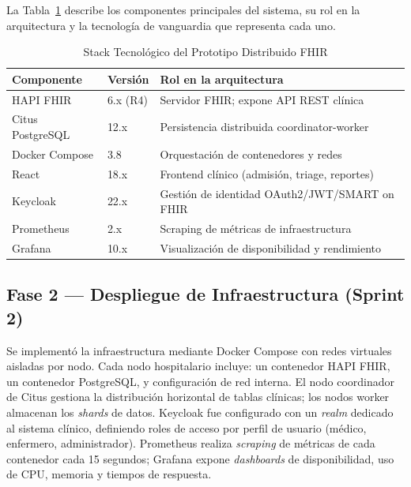 \documentclass[conference]{IEEEtran}
\begin{document}
La Tabla~\ref{tab:componentes} describe los componentes principales
del sistema, su rol en la arquitectura y la tecnolog\'ia de vanguardia
que representa cada uno.

\begin{table}[htbp]
\caption{Stack Tecnol\'ogico del Prototipo Distribuido FHIR}
\label{tab:componentes}
\begin{center}
\renewcommand{\arraystretch}{1.2}
\begin{tabular}{|p{1.9cm}|p{1.5cm}|p{3.9cm}|}
\hline
\textbf{Componente} & \textbf{Versi\'on} & \textbf{Rol en la arquitectura} \\
\hline
HAPI FHIR & 6.x (R4) & Servidor FHIR; expone API REST cl\'inica \\
\hline
Citus PostgreSQL & 12.x & Persistencia distribuida coordinator-worker \\
\hline
Docker Compose & 3.8 & Orquestaci\'on de contenedores y redes \\
\hline
React & 18.x & Frontend cl\'inico (admisi\'on, triage, reportes) \\
\hline
Keycloak & 22.x & Gesti\'on de identidad OAuth2/JWT/SMART on FHIR \\
\hline
Prometheus & 2.x & Scraping de m\'etricas de infraestructura \\
\hline
Grafana & 10.x & Visualizaci\'on de disponibilidad y rendimiento \\
\hline
\end{tabular}
\end{center}
\end{table}

\subsection{Fase 2 --- Despliegue de Infraestructura (Sprint 2)}

Se implement\'o la infraestructura mediante Docker Compose con redes
virtuales aisladas por nodo. Cada nodo hospitalario incluye: un
contenedor HAPI FHIR, un contenedor PostgreSQL, y configuraci\'on de
red interna. El nodo coordinador de Citus gestiona la distribuci\'on
horizontal de tablas cl\'inicas; los nodos worker almacenan los
\textit{shards} de datos. Keycloak fue configurado con un \textit{realm}
dedicado al sistema cl\'inico, definiendo roles de acceso por perfil
de usuario (m\'edico, enfermero, administrador). Prometheus realiza
\textit{scraping} de m\'etricas de cada contenedor cada 15 segundos;
Grafana expone \textit{dashboards} de disponibilidad, uso de CPU,
memoria y tiempos de respuesta.
\end{document}
